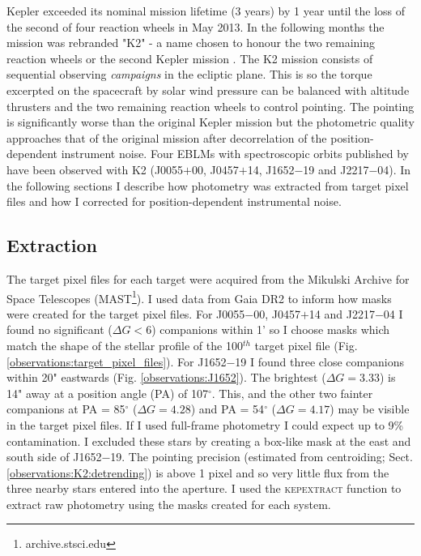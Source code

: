 Kepler exceeded its nominal mission lifetime (3 years) by 1 year until the loss of the second of four reaction wheels in May 2013. In the following months the mission was rebranded "K2" - a name chosen to honour the two remaining reaction wheels or the second Kepler mission \citep{2014PASP..126..398H}. The K2 mission consists of sequential observing \textit{campaigns} in the ecliptic plane. This is so the torque excerpted on the spacecraft by solar wind pressure can be balanced with altitude thrusters and the two remaining reaction wheels to control pointing. The pointing is significantly worse than the original Kepler mission but the photometric quality approaches that of the original mission after decorrelation of the position-dependent instrument noise. Four EBLMs with spectroscopic orbits published by \citet{Triaud2017} have been observed with K2 (J0055$+$00, J0457$+$14,  J1652$-$19 and J2217$-$04). In the following sections I describe how  photometry was extracted from target pixel files and how I corrected for position-dependent instrumental noise.


\subsection{Extraction}\label{observations:K2:extract}

The target pixel files for each target were acquired from the Mikulski Archive for Space Telescopes (MAST\footnote{archive.stsci.edu}). I used data from Gaia DR2 to inform how masks were created for the target pixel files. For J0055$-$00, J0457$+$14 and J2217$-$04 I found no significant ($\Delta G < 6$) companions within 1' so I choose masks which match the shape of the stellar profile of the 100$^{th}$ target pixel file (Fig. \ref{observations:target_pixel_files}). For J1652$-$19 I found three close companions within 20" eastwards (Fig. \ref{observations:J1652}). The brightest ($\Delta G = 3.33$) is 14" away at a position angle (PA) of 107$^{\circ}$. This, and the other two fainter companions at PA = 85$^{\circ}$ ($\Delta G = 4.28$) and PA = 54$^{\circ}$ ($\Delta G = 4.17$) may be visible in the target pixel files. If I used full-frame photometry I could expect up to 9\% contamination. I excluded these stars by creating a box-like mask at the east and south side of J1652$-$19. The pointing precision (estimated from centroiding; Sect. \ref{observations:K2:detrending}) is above 1 pixel and so very little flux from the three nearby stars entered into the aperture. I used the \textsc{kepextract} function \citep{pyke3} to extract raw photometry using the masks created for each system. 


